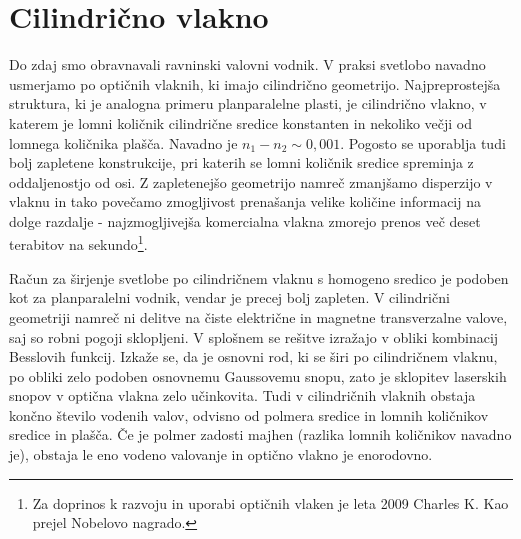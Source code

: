 \section{Cilindrično vlakno}
\label{chap:Cilinder}
Do zdaj smo obravnavali ravninski valovni vodnik. V praksi svetlobo
navadno usmerjamo po optičnih vlaknih, ki imajo cilindrično geometrijo.
Najpreprostejša struktura, ki je analogna primeru planparalelne
plasti, je cilindrično vlakno, v katerem je lomni količnik cilindrične
sredice konstanten in nekoliko večji od lomnega količnika plašča. Navadno je 
$n_1 - n_2 \sim 0,001$. Pogosto se uporablja
tudi bolj zapletene konstrukcije, pri katerih se lomni količnik sredice spreminja z
oddaljenostjo od osi. Z zapletenejšo geometrijo namreč zmanjšamo disperzijo v vlaknu in tako
povečamo zmogljivost prenašanja velike količine informacij na dolge razdalje - 
najzmogljivejša komercialna vlakna zmorejo prenos več deset terabitov na 
sekundo\footnote{Za doprinos k razvoju in uporabi optičnih vlaken je leta 2009 Charles
K. Kao prejel Nobelovo nagrado.}.

Račun za širjenje svetlobe po cilindričnem vlaknu s homogeno sredico
je podoben kot za planparalelni vodnik, vendar je precej bolj
zapleten. V cilindrični geometriji namreč ni delitve na čiste električne in 
magnetne transverzalne valove, saj so robni pogoji sklopljeni. V splošnem se rešitve izražajo 
v obliki kombinacij Besslovih funkcij. Izkaže se, da je osnovni rod, ki se  širi po
cilindričnem vlaknu, po obliki zelo podoben osnovnemu Gaussovemu snopu, zato je sklopitev
laserskih snopov v optična vlakna zelo učinkovita.
Tudi v cilindričnih vlaknih obstaja končno število vodenih valov, odvisno od polmera sredice in
lomnih količnikov sredice in plašča. Če je polmer zadosti majhen (razlika lomnih
količnikov navadno je), obstaja le eno vodeno valovanje in optično vlakno je enorodovno. 

